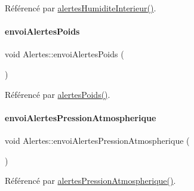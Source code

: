Référencé par \hyperlink{class_alertes_a7558cb097dc392547ceb12ab4d6cbd4c}{alertes\+Humidite\+Interieur()}.

\mbox{\label{class_alertes_a60f823014dcce3504ee1d78ac50b5328}} 
\paragraph{\texorpdfstring{envoi\+Alertes\+Poids}{envoiAlertesPoids}}
{\footnotesize\ttfamily void Alertes\+::envoi\+Alertes\+Poids (\begin{DoxyParamCaption}\item[{\hyperlink{parametres_8h_aaa6de8207c94675264c90b10b613368d}{Seuils\+Alertes}}]{ }\end{DoxyParamCaption})\hspace{0.3cm}{\ttfamily [signal]}}



Référencé par \hyperlink{class_alertes_ac4b8925cc6c262cf7254b1576ba07d33}{alertes\+Poids()}.

\mbox{\label{class_alertes_a3e81bcca9d4c91c69f575546681590bc}} 
\paragraph{\texorpdfstring{envoi\+Alertes\+Pression\+Atmospherique}{envoiAlertesPressionAtmospherique}}
{\footnotesize\ttfamily void Alertes\+::envoi\+Alertes\+Pression\+Atmospherique (\begin{DoxyParamCaption}\item[{\hyperlink{parametres_8h_aaa6de8207c94675264c90b10b613368d}{Seuils\+Alertes}}]{ }\end{DoxyParamCaption})\hspace{0.3cm}{\ttfamily [signal]}}



Référencé par \hyperlink{class_alertes_ab8a33e82cdd4d4e0560c9ba6e10ca8d5}{alertes\+Pression\+Atmospherique()}.

\mbox{\label{class_alertes_a7b257375a0d8ad5f41abaa572799aae4}} 
